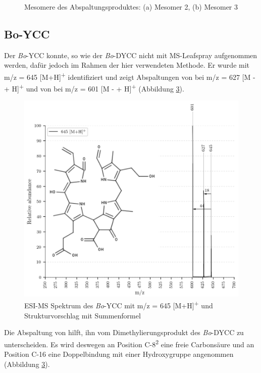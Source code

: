 \begin{figure}[!htbp]
\begin{subfigure}[b]{0.5\textwidth}
    \caption{}
    \label{fig:311MHMesomer3}
  \end{subfigure}
  \caption[2 Mesomere für potentielle Abspaltungsprodukte von \textit{Bo}-DNCC, Quelle: Autor]{Mesomere des Abspaltungsproduktes: (a) Mesomer 2, (b) Mesomer 3}
\end{figure}

\pagebreak
\subsection{Bo-YCC}

Der \textit{Bo}-YCC konnte, so wie der \textit{Bo}-DYCC nicht mit MS-Leafspray aufgenommen werden, dafür jedoch im Rahmen der hier verwendeten Methode. Er wurde mit m/z = 645 [M+H]\textsuperscript{+} identifiziert und zeigt Abspaltungen von  bei m/z = 627 [M -  + H]\textsuperscript{+} und von  bei m/z = 601 [M -  + H]\textsuperscript{+} (Abbildung \ref{fig:645MH}). 

\begin{figure}[!htbp]
  \centering
  \includegraphics[width=\textwidth, height=0.8\textwidth]{figures/Kapitel7/Kataboliten/VWA_MS_645-12.png}
  \caption[ESI-MS Spektrum des \textit{Bo}-YCC, Quelle: Autor]{ESI-MS Spektrum des \textit{Bo}-YCC mit m/z = 645 [M+H]\textsuperscript{+} und Strukturvorschlag mit Summenformel }
  \label{fig:645MH}
\end{figure}

Die Abspaltung von  hilft, ihn vom Dimethylierungsprodukt des \textit{Bo}-DYCC zu unterscheiden. Es wird deswegen an Position C-8\textsuperscript{2} eine freie Carbonsäure und an Position C-16 eine Doppelbindung mit einer Hydroxygruppe angenommen (Abbildung \ref{fig:645MH}).



